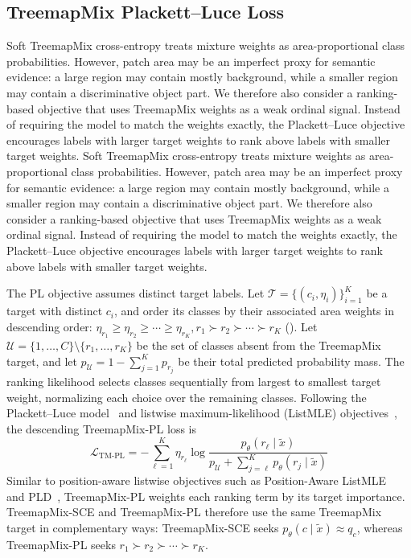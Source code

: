 \subsection{TreemapMix Plackett--Luce Loss}\label{sec:pl}

Soft TreemapMix cross-entropy treats mixture weights as area-proportional class probabilities. However, patch area may be an imperfect proxy for semantic evidence: a large region may contain mostly background, while a smaller region may contain a discriminative object part. We therefore also consider a ranking-based objective that uses TreemapMix weights as a weak ordinal signal. Instead of requiring the model to match the weights exactly, the Plackett--Luce objective encourages labels with larger target weights to rank above labels with smaller target weights.
Soft TreemapMix cross-entropy treats mixture weights as area-proportional class probabilities. However, patch area may be an imperfect proxy for semantic evidence: a large region may contain mostly background, while a smaller region may contain a discriminative object part. We therefore also consider a ranking-based objective that uses TreemapMix weights as a weak ordinal signal. Instead of requiring the model to match the weights exactly, the Plackett--Luce objective encourages labels with larger target weights to rank above labels with smaller target weights.

The PL objective assumes distinct target labels. Let $\mathcal{T}=\{(c_i,\eta_i)\}_{i=1}^{K}$ be a target with distinct $c_i$, and order its classes by their associated area weights in descending order: \label{eq:descending-ranking}\(\eta_{r_1}\ge \eta_{r_2}\ge \cdots \ge \eta_{r_K}, r_1\succ r_2\succ\cdots\succ r_K\)\textup{ (\theequation)}. Let $\mathcal{U}=\{1,\dots,C\}\setminus\{r_1,\dots,r_K\}$ be the set of classes absent from the TreemapMix target, and let $p_{\mathcal U}=1-\sum_{j=1}^{K}p_{r_j}$ be their total predicted probability mass.
The ranking likelihood selects classes sequentially from largest to smallest target weight, normalizing each choice over the remaining classes. Following the Plackett--Luce model~\cite{luce1959,plackett1975} and listwise maximum-likelihood (ListMLE) objectives~\cite{listmle}, the descending TreemapMix-PL loss is
\begin{equation}
\label{eq:lm-pl-desc}
\mathcal{L}_{\mathrm{TM\text{-}PL}}=-\sum_{\ell=1}^{K}\eta_{r_\ell}\log \frac{p_\theta(r_\ell\mid\tilde{x})}{p_{\mathcal U}+\sum_{j=\ell}^{K}p_\theta(r_j\mid\tilde{x})}
\end{equation}
Similar to position-aware listwise objectives such as Position-Aware ListMLE~\cite{plistmle} and PLD~\cite{pld}, TreemapMix-PL weights each ranking term by its target importance. TreemapMix-SCE and TreemapMix-PL therefore use the same TreemapMix target in complementary ways: TreemapMix-SCE seeks \(p_\theta(c\mid\tilde{x})\approx q_c\), whereas TreemapMix-PL seeks \(r_1\succ r_2\succ\cdots\succ r_K\).

